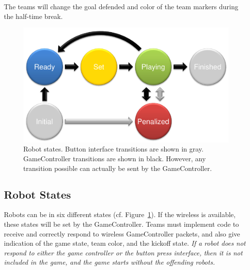 \documentclass[12pt]{article}
\newcommand{\cf}{\mbox{cf.}\xspace}
\begin{document}
The teams will change the goal defended and color of the team markers during the half-time break.

\begin{figure}[t]
\centerline{\includegraphics[width=0.9\columnwidth]{figs/states.pdf}}
\caption{Robot states. Button interface transitions are shown in gray. GameController transitions are shown in black. However, any transition possible can actually be sent by the GameController.}
\label{fig:robot_states}
\end{figure}

\subsection{Robot States}
\label{sec:robot_states}

Robots can be in six different states (\cf Figure~\ref{fig:robot_states}). If the wireless is available, these states will be set by the GameController. Teams must implement code to receive and correctly respond to wireless GameController packets, and also give indication of the game state, team color, and the kickoff state.
\emph{If a robot does not respond to either the game controller or the button press interface, then it is not included in the game, and the game starts without the offending robots.}
\end{document}
